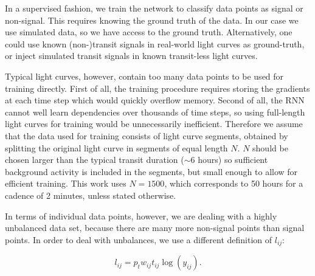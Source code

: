 In a supervised fashion, we train the network to classify data points as signal or non-signal. This requires knowing the ground truth of the data. In our case we use simulated data, so we have access to the ground truth. Alternatively, one could use known (non-)transit signals in real-world light curves as ground-truth, or inject simulated transit signals in known transit-less light curves. 

Typical light curves, however, contain too many data points to be used for training directly. First of all, the training procedure requires storing the gradients at each time step which would quickly overflow memory. Second of all, the RNN cannot well learn dependencies over thousands of time steps, so using full-length light curves for training would be unnecessarily inefficient. Therefore we assume that the data used for training consists of light curve segments, obtained by splitting the original light curve in segments of equal length $N$. $N$ should be chosen larger than the typical transit duration ($\sim$6 hours) so sufficient background activity is included in the segments, but small enough to allow for efficient training. This work uses $N=1500$, which corresponds to 50 hours for a cadence of 2 minutes, unless stated otherwise.



In terms of individual data points, however, we are dealing with a highly unbalanced data set, because there are many more non-signal points than signal points. In order to deal with unbalances, we use a different definition of $l_{ij}$:

\begin{equation}
    l_{ij} = p_t w_{ij} t_{ij} \log( y_{ij} ).
\end{equation}

